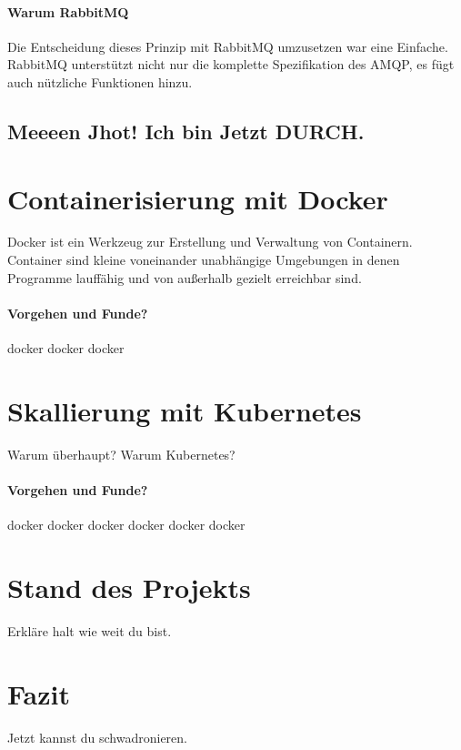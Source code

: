 \documentclass[12pt,a4paper]{article}
\begin{document}
\paragraph{Warum RabbitMQ}
Die Entscheidung dieses Prinzip mit \gls{RabbitMQ} umzusetzen war eine Einfache. \gls{RabbitMQ} unterstützt nicht nur die komplette Spezifikation des \gls{AMQP}, es fügt auch nützliche Funktionen hinzu\cite{rabExt}.

\subsection{Meeeen Jhot! Ich bin Jetzt DURCH.}

\section{Containerisierung mit \gls{Docker}} \label{docker}
Docker ist ein Werkzeug zur Erstellung und Verwaltung von Containern. Container sind kleine voneinander unabhängige Umgebungen in denen Programme lauffähig und von außerhalb gezielt erreichbar sind.

\paragraph{Vorgehen und Funde?}
docker docker docker

\section{Skallierung mit \gls{Kubernetes}} \label{kubernetes}
Warum überhaupt? Warum Kubernetes?

\paragraph{Vorgehen und Funde?}
docker docker docker docker docker docker

\section{Stand des Projekts} \label{project_status}
Erkläre halt wie weit du bist.

\section{Fazit}\label{conclusion}
Jetzt kannst du schwadronieren.
\newpage


\printbibliography
\newpage
\printglossary
\end{document}

